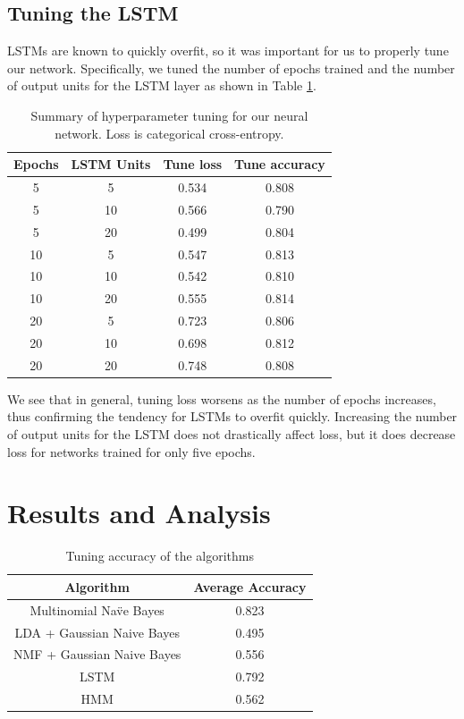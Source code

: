 \documentclass{article}
\begin{document}
\subsection{Tuning the LSTM}

LSTMs are known to quickly overfit, so it was important for us to properly tune
our network. Specifically, we tuned the number of epochs trained and the number
of output units for the LSTM layer as shown in Table \ref{tab:nn-tune}.

\begin{table}[!ht]
    \centering
    \begin{tabular}{|c|c|c|c|}
        \hline
        Epochs & LSTM Units & Tune loss & Tune accuracy\\
        \hline
        5 & 5 & 0.534 & 0.808 \\
        5 & 10 & 0.566 & 0.790 \\
        5 & 20 & 0.499 & 0.804 \\
        10 & 5 & 0.547 & 0.813 \\
        10 & 10 & 0.542 & 0.810 \\
        10 & 20 & 0.555 & 0.814 \\
        20 & 5 & 0.723 & 0.806 \\
        20 & 10 & 0.698 & 0.812 \\
        20 & 20 & 0.748 & 0.808 \\
        \hline
    \end{tabular}
    \caption{Summary of hyperparameter tuning for our neural network. Loss is
    categorical cross-entropy.}
    \label{tab:nn-tune}
\end{table}

We see that in general, tuning loss worsens as the number of epochs increases,
thus confirming the tendency for LSTMs to overfit quickly. Increasing the
number of output units for the LSTM does not drastically affect loss, but
it does decrease loss for networks trained for only five epochs.

\section{Results and Analysis}
\begin{table}[!ht]
    \centering
    \begin{tabular}{|c|c|}
        \hline
        Algorithm & Average Accuracy \\ \hline
        Multinomial Na\"ve Bayes & 0.823  \\
        LDA + Gaussian Naive Bayes & 0.495\\
        NMF + Gaussian Naive Bayes & 0.556  \\
        LSTM & 0.792 \\
        HMM & 0.562 \\ \hline
    \end{tabular}
    \caption{Tuning accuracy of the algorithms}
    \label{tab:results}
\end{table}
\end{document}
